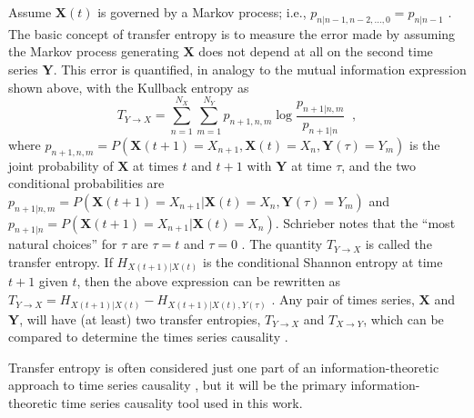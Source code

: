 Assume $\mathbf{X}(t)$ is governed by a Markov process; i.e., $p_{n|n-1,n-2,\ldots,0} = p_{n|n-1}$ \cite{statsbook_placeholder}.  The basic concept of transfer entropy is to measure the error made by assuming the Markov process generating $\mathbf{X}$ does not depend at all on the second time series $\mathbf{Y}$.  This error is quantified, in analogy to the mutual information expression shown above, with the Kullback entropy as
\begin{equation}
\label{eqn:TE}
T_{Y\rightarrow X} = \sum_{n=1}^{N_X} \sum_{m=1}^{N_Y} p_{n+1,n,m}\log \frac{p_{n+1|n,m}}{p_{n+1|n}}\;\;,
\end{equation}
where $p_{n+1,n,m} = P(\mathbf{X}(t+1)=X_{n+1},\mathbf{X}(t)=X_n,\mathbf{Y}(\tau)=Y_m)$ is the joint probability of $\mathbf{X}$ at times $t$ and $t+1$ with $\mathbf{Y}$ at time $\tau$, and the two conditional probabilities are $p_{n+1|n,m} = P(\mathbf{X}(t+1)=X_{n+1}|\mathbf{X}(t)=X_n,\mathbf{Y}(\tau)=Y_m)$ and $p_{n+1|n} = P(\mathbf{X}(t+1)=X_{n+1}|\mathbf{X}(t)=X_n)$.  Schrieber notes that the ``most natural choices'' for $\tau$ are $\tau=t$ and $\tau=0$ \cite{Schreiber2000}.  The quantity $T_{Y\rightarrow X}$ is called the transfer entropy.  If $H_{X(t+1)|X(t)}$ is the conditional Shannon entropy at time $t+1$ given $t$, then the above expression can be rewritten as $T_{Y\rightarrow X} = H_{X(t+1)|X(t)}-H_{X(t+1)|X(t),Y(\tau)}$ \cite{Kaiser2002}.  Any pair of times series, $\mathbf{X}$ and $\mathbf{Y}$, will have (at least) two transfer entropies, $T_{Y\rightarrow X}$ and $T_{X\rightarrow Y}$, which can be compared to determine the times series causality \cite{Schreiber2000}.  

Transfer entropy is often considered just one part of an information-theoretic approach to time series causality \cite{Schindler2007}, but it will be the primary information-theoretic time series causality tool used in this work.

